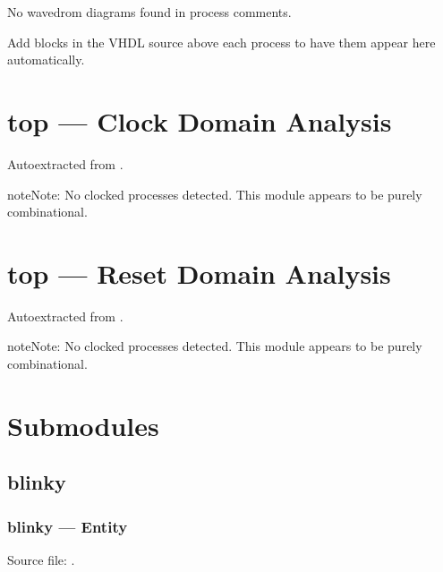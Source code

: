 \documentclass[letterpaper,10pt,english]{sphinxmanual}
\begin{document}
\sphinxAtStartPar
No wavedrom diagrams found in process comments.

\sphinxAtStartPar
Add  blocks in the VHDL source above each
process to have them appear here automatically.

\sphinxstepscope


\section{top — Clock Domain Analysis}
\label{\detokenize{modules/top/cdc:top-clock-domain-analysis}}\label{\detokenize{modules/top/cdc::doc}}
\sphinxAtStartPar
Auto\sphinxhyphen{}extracted from .

\begin{sphinxadmonition}{note}{Note:}
\sphinxAtStartPar
No clocked processes detected. This module appears to be purely combinational.
\end{sphinxadmonition}

\sphinxstepscope


\section{top — Reset Domain Analysis}
\label{\detokenize{modules/top/reset:top-reset-domain-analysis}}\label{\detokenize{modules/top/reset::doc}}
\sphinxAtStartPar
Auto\sphinxhyphen{}extracted from .

\begin{sphinxadmonition}{note}{Note:}
\sphinxAtStartPar
No clocked processes detected. This module appears to be purely combinational.
\end{sphinxadmonition}


\section{Submodules}
\label{\detokenize{modules/top/index:submodules}}
\sphinxstepscope


\subsection{blinky}
\label{\detokenize{modules/blinky/index:blinky}}\label{\detokenize{modules/blinky/index::doc}}
\sphinxstepscope


\subsubsection{blinky — Entity}
\label{\detokenize{modules/blinky/entity:blinky-entity}}\label{\detokenize{modules/blinky/entity::doc}}
\sphinxAtStartPar
Source file: .
\end{document}
